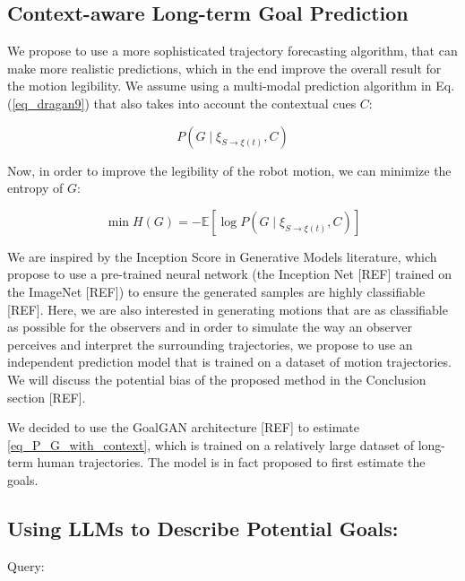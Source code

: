 \subsection{Context-aware Long-term Goal Prediction}

We propose to use a more sophisticated trajectory forecasting algorithm, that can make more realistic predictions, which in the end improve the overall result for the motion legibility.
%
We assume using a multi-modal prediction algorithm in Eq. (\ref{eq_dragan9}) that also takes into account the contextual cues $C$:

\begin{equation}
    \label{eq_P_G_with_context}
     P\left(G \mid \xi_{S \rightarrow \xi(t)}, C \right) 
\end{equation}

\noindent
Now, in order to improve the legibility of the robot motion, we can minimize the entropy of $G$:

\begin{equation}
    \label{eq_H_G}
    \min H(G) = -\mathbb{E} \left[\log P(G \mid \xi_{S \rightarrow \xi(t)}, C ) \right]
\end{equation}

We are inspired by the Inception Score in Generative Models literature, which propose to use a pre-trained neural network (the Inception Net [REF] trained on the
ImageNet [REF]) to ensure the generated samples are highly classifiable [REF]. Here, we are also interested in generating motions that are as classifiable as possible for the observers and in order to simulate the way an observer perceives and interpret the surrounding trajectories, we propose to use an independent prediction model that is trained on a dataset of motion trajectories.
We will discuss the potential bias of the proposed method in the Conclusion section [REF].

We decided to use the GoalGAN architecture [REF] to estimate \ref{eq_P_G_with_context}, which is trained on a relatively large dataset of long-term human trajectories. The model is in fact proposed to first estimate the goals.


\subsection{Using LLMs to Describe Potential Goals:}

Query: 




